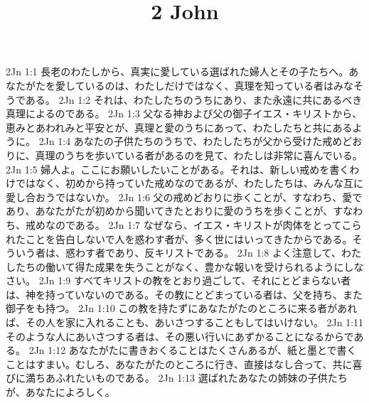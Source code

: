 

\title{2 John}

2Jn 1:1  長老のわたしから、真実に愛している選ばれた婦人とその子たちへ。あなたがたを愛しているのは、わたしだけではなく、真理を知っている者はみなそうである。
2Jn 1:2  それは、わたしたちのうちにあり、また永遠に共にあるべき真理によるのである。
2Jn 1:3  父なる神および父の御子イエス・キリストから、恵みとあわれみと平安とが、真理と愛のうちにあって、わたしたちと共にあるように。
2Jn 1:4  あなたの子供たちのうちで、わたしたちが父から受けた戒めどおりに、真理のうちを歩いている者があるのを見て、わたしは非常に喜んでいる。
2Jn 1:5  婦人よ。ここにお願いしたいことがある。それは、新しい戒めを書くわけではなく、初めから持っていた戒めなのであるが、わたしたちは、みんな互に愛し合おうではないか。
2Jn 1:6  父の戒めどおりに歩くことが、すなわち、愛であり、あなたがたが初めから聞いてきたとおりに愛のうちを歩くことが、すなわち、戒めなのである。
2Jn 1:7  なぜなら、イエス・キリストが肉体をとってこられたことを告白しないで人を惑わす者が、多く世にはいってきたからである。そういう者は、惑わす者であり、反キリストである。
2Jn 1:8  よく注意して、わたしたちの働いて得た成果を失うことがなく、豊かな報いを受けられるようにしなさい。
2Jn 1:9  すべてキリストの教をとおり過ごして、それにとどまらない者は、神を持っていないのである。その教にとどまっている者は、父を持ち、また御子をも持つ。
2Jn 1:10  この教を持たずにあなたがたのところに来る者があれば、その人を家に入れることも、あいさつすることもしてはいけない。
2Jn 1:11  そのような人にあいさつする者は、その悪い行いにあずかることになるからである。
2Jn 1:12  あなたがたに書きおくることはたくさんあるが、紙と墨とで書くことはすまい。むしろ、あなたがたのところに行き、直接はなし合って、共に喜びに満ちあふれたいものである。
2Jn 1:13  選ばれたあなたの姉妹の子供たちが、あなたによろしく。


